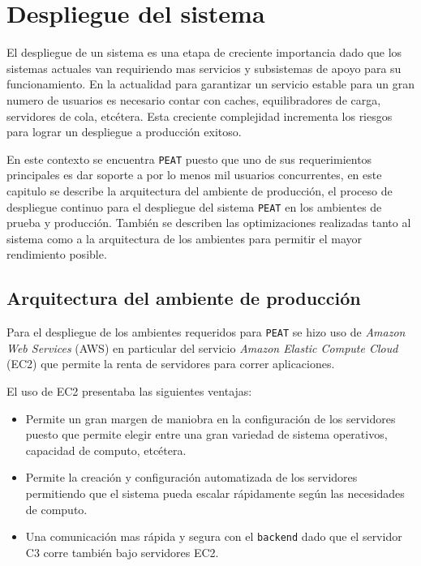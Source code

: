 \chapter{Despliegue del sistema}

El despliegue de un sistema es una etapa de creciente importancia dado que los
sistemas actuales van requiriendo mas servicios y subsistemas de apoyo para
su funcionamiento. En la actualidad para garantizar un servicio estable para
un gran numero de usuarios es necesario contar con caches, equilibradores de
carga, servidores de cola, etcétera. Esta creciente complejidad incrementa los
riesgos para lograr un despliegue a producción exitoso.

En este contexto se encuentra \texttt{PEAT} puesto que uno de sus requerimientos
principales es dar soporte a por lo menos mil usuarios concurrentes, en este
capitulo se describe la arquitectura del ambiente de producción, el proceso
de despliegue continuo para el despliegue del sistema \texttt{PEAT} en los
ambientes de prueba y producción. También se describen las optimizaciones realizadas
tanto al sistema como a la arquitectura de los ambientes para permitir el mayor
rendimiento posible.

\section{Arquitectura del ambiente de producción}
\label{sec:production}

Para el despliegue de los ambientes requeridos para \texttt{PEAT} se hizo uso de
\textit{Amazon Web Services} (AWS) en particular del servicio
\textit{Amazon Elastic Compute Cloud} (EC2) que permite la renta de servidores
para correr aplicaciones.

El uso de EC2 presentaba las siguientes ventajas:
\begin{itemize}
\item Permite un gran margen de maniobra en la configuración de los servidores
  puesto que permite elegir entre una gran variedad de sistema operativos,
  capacidad de computo, etcétera.
\item Permite la creación y configuración automatizada de los servidores
  permitiendo que el sistema pueda escalar rápidamente según las necesidades
  de computo.
\item Una comunicación mas rápida y segura con el \texttt{backend} dado que el
  servidor C3 corre también bajo servidores EC2.
\end{itemize}

